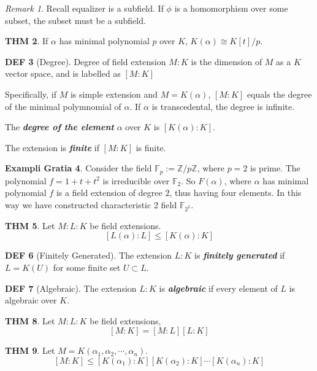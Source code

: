 \documentclass[twocolumn]{article}
\renewcommand{\emph}[1]{\textbf{\textit{#1}}}
\newcommand{\Z}{\mathbb{Z}}
\newcommand{\F}{\mathbb{F}}
\theoremstyle{definition}
\newtheorem{thm}{THM}
\newtheorem{example}[thm]{Exampli Gratia}
\newtheorem{defi}[thm]{DEF}
\theoremstyle{remark}
\newtheorem{remark}[thm]{Remark}
\begin{document}
\begin{remark}
	Recall equalizer is a subfield. If $\phi$ is a homomorphism over some subset, the subset must be a subfield.
\end{remark}

\begin{thm}
	If $\alpha$ has minimal polynomial $p$ over $K$, $K(\alpha) \cong K[t]/p$.
\end{thm}

\begin{defi}[Degree]
	Degree of field extension $M : K$ is the dimension of $M$ as a $K$ vector space, and is labelled as $[M : K]$

	Specifically, if $M$ is simple extension and $ M = K(\alpha)$, $[M : K]$ equals the degree of the minimal polymnomial of $\alpha$.
	If $\alpha$ is transcedental, the degree is infinite.

	The \emph{degree of the element} $\alpha$ over $K$ is $[K(\alpha): K]$.

	The extension is \emph{finite} if $[M : K]$ is finite.
\end{defi}

\begin{example}
	Consider the field $\F_p := \Z / p\Z$, where $p = 2$ is prime.
	The polynomial $f=1 + t + t^2$ is irreducible over $\F_2$. 
	So $F(\alpha)$, where $\alpha$ has minimal polynomial $f$ is a field extension of degree $2$, thus having four elements. 
	In this way we have constructed characteristic 2 field $\F_{2^2}$.
\end{example}

\begin{thm}
	Let $M : L : K$ be field extensions. 
	$$[L(\alpha): L] \leq[ K(\alpha) : K]$$
\end{thm}

\begin{defi}[Finitely Generated]
	The extension $L:K$ is \emph{finitely generated} if $L = K(U)$ for some finite set $U \subset L$.
\end{defi}

\begin{defi}[Algebraic]
	The extension $L:K$ is \emph{algebraic} if every element of $L$ is algebraic over $K$.
\end{defi}

\begin{thm}
	Let $M:L:K$ be field extensions,
	$$[M:K] = [M:L][L:K]$$
\end{thm}

\begin{thm}
	Let $M = K(\alpha_1, \alpha_2, \cdots, \alpha_n)$.
	$$[M:K] \leq [K(\alpha_1):K][K(\alpha_2):K] \cdots[K(\alpha_n):K]$$
\end{thm}
\end{document}
